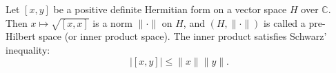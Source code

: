 Let $[x, y]$ be a positive definite Hermitian form on a vector space $H$ over $\mathbb{C}$. Then $x \mapsto \sqrt{[x, x]}$ is a norm $\|\cdot\|$ on $H$, and $(H, \|\cdot\|)$ is called a pre-Hilbert space (or inner product space). The inner product satisfies Schwarz' inequality:
$$|[x, y]| \leq \|x\| \|y\|.$$
